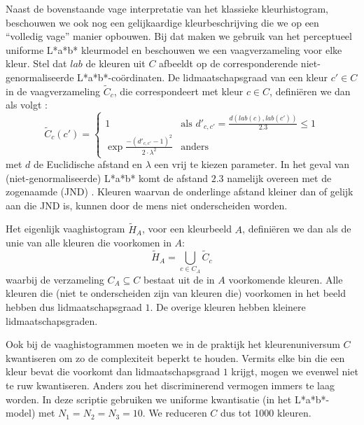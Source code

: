 Naast de bovenstaande vage interpretatie van het klassieke kleurhistogram, 
beschouwen we ook nog een gelijkaardige kleurbeschrijving die we op een 
``volledig vage'' manier opbouwen. Bij dat  maken we 
gebruik van het perceptueel uniforme L*a*b* kleurmodel en beschouwen we een 
vaagverzameling voor elke kleur. Stel dat $lab$ de kleuren uit $C$ afbeeldt op de
corresponderende niet-genormaliseerde L*a*b*-co\"ordinaten. De lidmaatschapsgraad van een 
kleur $c' \in C$ in de vaagverzameling $\widetilde{C}_c$, die correspondeert met kleur $c \in C$, 
defini\"eren we dan als volgt \cite{vertan:fuzzy_histograms}:
\begin{displaymath}
\widetilde{C}_c(c') =
\begin{cases}
1 & \textrm{als } d'_{c,c'} = \frac{d \left( lab(c), lab(c') \right)}{2.3} \leq 1 \\ 
\exp \frac{- \left( d'_{c,c'} - 1 \right)^2}{2 \cdot \lambda^2} & \textrm{anders}
\end{cases}
\end{displaymath} 
met $d$ de Euclidische afstand en $\lambda$ een vrij te kiezen parameter. In 
het geval van (niet-ge\-nor\-ma\-li\-seer\-de) L*a*b* komt de afstand $2.3$ namelijk 
overeen met de zogenaamde 
 (JND) \cite{sharma:digital_color_imaging}. 
Kleuren waarvan de onderlinge afstand kleiner dan of gelijk aan die JND is, 
kunnen door de mens niet onderscheiden worden.

Het eigenlijk vaaghistogram $\widetilde{H}_A$, voor een kleurbeeld $A$, defini\"eren we 
dan als de unie van alle kleuren die voorkomen in $A$: 
\begin{displaymath} 
\widetilde{H}_A = \displaystyle\bigcup_{c \in C_A} \widetilde{C}_c
\end{displaymath}
waarbij de verzameling $C_A \subseteq C$ bestaat uit de in $A$ voorkomende kleuren. Alle 
kleuren die (niet te onderscheiden zijn van kleuren die) voorkomen in het beeld 
hebben dus lidmaatschapsgraad $1$. De overige kleuren hebben kleinere 
lidmaatschapsgraden. 

Ook bij de vaaghistogrammen moeten we in de praktijk het kleurenuniversum $C$ 
kwantiseren om zo de complexiteit beperkt te houden. Vermits elke bin die een kleur
bevat die voorkomt dan lidmaatschapsgraad $1$ krijgt, mogen we evenwel niet te
ruw kwantiseren. Anders zou het discriminerend vermogen immers te laag worden. In deze
scriptie gebruiken we uniforme kwantisatie (in het L*a*b*-model) met $N_1=N_2=N_3=10$.
We reduceren $C$ dus tot 1000 kleuren. 

